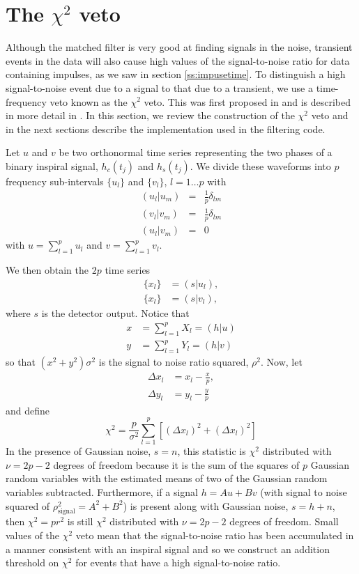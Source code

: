 \section{The $\chi^2$ veto}
\label{s:chisqcts}

Although the matched filter is very good at finding signals in the noise,
transient events in the data will also cause high values of the
signal-to-noise ratio for data containing impulses, as we saw in section
\ref{ss:impusetime}. To distinguish a high signal-to-noise event due to a
signal to that due to a transient, we use a time-frequency veto known as the
$\chi^2$ veto. This was first proposed in \cite{grasp} and is described in
more detail in \cite{Allen:2004}.  In this section, we review the construction
of the $\chi^2$ veto and in the next sections describe the implementation used
in the filtering code.

Let $u$ and $v$ be two orthonormal time series representing the two phases of a
binary inspiral signal, $h_c(t_j)$ and $h_s(t_j)$.  We divide these waveforms
into $p$ frequency sub-intervals $\{u_l\}$ and $\{v_l\}$, $l=1\ldots p$ with
\begin{eqnarray}
  (u_l|u_m) &=& \frac{1}{p}\delta_{lm} \\
  (v_l|v_m) &=& \frac{1}{p}\delta_{lm} \\
  (u_l|v_m) &=& 0
\end{eqnarray}
with $u=\sum_{l=1}^p u_l$ and $v=\sum_{l=1}^p v_l$.

We then obtain the $2p$ time series
\begin{align}
\{x_l\} & =(s|u_l),\\ 
\{x_l\} & =(s|v_l),
\end{align}
where $s$ is the detector output. Notice that 
\begin{align}
x &= \sum_{l=1}^p X_l=(h|u) \\
y &=\sum_{l=1}^p Y_l=(h|v)
\end{align}
so that $(x^2+y^2)\sigma^2$ is the signal to noise ratio squared, $\rho^2$.
Now, let 
\begin{align}
\Delta x_l &= x_l - \frac{x}{p}, \\
\Delta y_l &= y_l - \frac{y}{p}
\end{align}
and define
\begin{equation}
\chi^2 = \frac{p}{\sigma^2} \sum_{l=1}^p \left[ (\Delta x_l)^2 + (\Delta x_l)^2 \right]
\end{equation}
In the presence of Gaussian noise, $s=n$, this statistic is $\chi^2$ distributed
with $\nu=2p-2$ degrees of freedom because it is the sum of the squares of $p$
Gaussian random variables with the estimated means of two of the Gaussian
random variables subtracted.  Furthermore, if a signal $h=Au+Bv$ (with signal
to noise squared of $\rho^2_{\mathrm{signal}}=A^2+B^2$) is present along with
Gaussian noise, $s=h+n$, then $\chi^2=pr^2$ is still $\chi^2$ distributed
with $\nu=2p-2$ degrees of freedom. Small values of the $\chi^2$ veto mean
that the signal-to-noise ratio has been accumulated in a manner consistent
with an inspiral signal and so we construct an addition threshold on $\chi^2$
for events that have a high signal-to-noise ratio.

